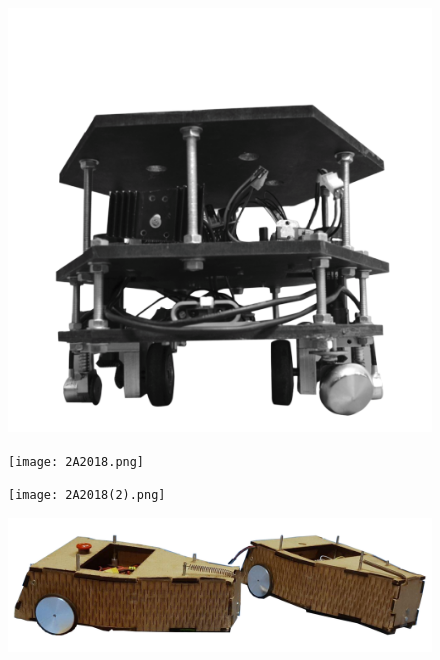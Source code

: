 \documentclass[a4paper,10pt]{article}
\begin{document}
\begin{spacing}{1.5}
\begin{multicols}{2}
\begin{figure}[H]
    \includegraphics[scale=0.3]{1A2018_2.png}
  \end{figure}
\end{multicols}

\begin{multicols}{2}
  \begin{figure}[H]
    \center
    \texttt{[image: 2A2018.png]}
  \end{figure}
  \columnbreak
  \begin{figure}[H]
    \center
    \texttt{[image: 2A2018(2).png]}
  \end{figure}
\end{multicols}

  \begin{figure}[H]
    \center
    \includegraphics[scale=0.45]{brenda.png}
  \end{figure}


\end{spacing}
\end{document}

